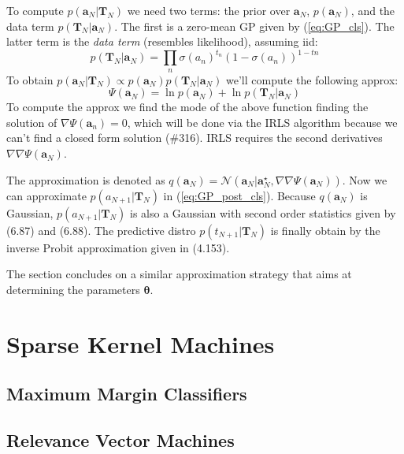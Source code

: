 \documentclass[a4paper]{article}
\newcommand{\mb}{\mathbf}
\newcommand{\bs}{\boldsymbol}
\begin{document}
To compute $p(\mb{a}_{N}|\mb{T}_{N})$ we need two terms: the prior over $\mb{a}_N$, $p(\mb{a}_{N})$, and the data term $p(\mb{T}_{N}|\mb{a}_{N})$. The first is a zero-mean GP given by (\ref{eq:GP_cls}). The latter term is the \textit{data term} (resembles likelihood), assuming iid:
%
\begin{equation}
p(\mb{T}_N|\mb{a}_N) = \prod\limits_n \sigma(a_n)^{t_n}(1-\sigma(a_n))^{1-tn}
\end{equation}
%
To obtain $p(\mb{a}_N|\mb{T}_N)\propto p(\mb{a}_N)p(\mb{T}_N|\mb{a}_N)$ we'll compute the following approx:
%
\begin{equation}
\Psi(\mb{a}_N) = \ln p(\mb{a}_N) + \ln p(\mb{T}_N|\mb{a}_N)
\end{equation}
%
To compute the approx we find the mode of the above function finding the solution of $\nabla \Psi(\mb{a}_n)=0$, which will be done via the IRLS algorithm because we can't find a closed form solution (\#316). IRLS requires the second derivatives $\nabla\nabla\Psi(\mb{a}_N)$.

The approximation is denoted as $q(\mb{a}_N) = \mathcal{N}(\mb{a}_N|\mb{a}_N^\star, \nabla\nabla\Psi(\mb{a}_N))$. Now we can approximate $p(a_{N+1}|\mb{T}_N)$ in (\ref{eq:GP_post_cls}). Because $q(\mb{a}_N)$ is Gaussian, $p(a_{N+1}|\mb{T}_N)$ is also a Gaussian with second order statistics given by (6.87) and (6.88). The predictive distro $p(t_{N+1}|\mb{T}_N)$ is finally obtain by the inverse Probit approximation given in (4.153).

The section concludes on a similar approximation strategy that aims at determining the parameters $\bs{\theta}$.




\section{Sparse Kernel Machines}

\subsection{Maximum Margin Classifiers}
\subsection{Relevance Vector Machines}
\end{document}
